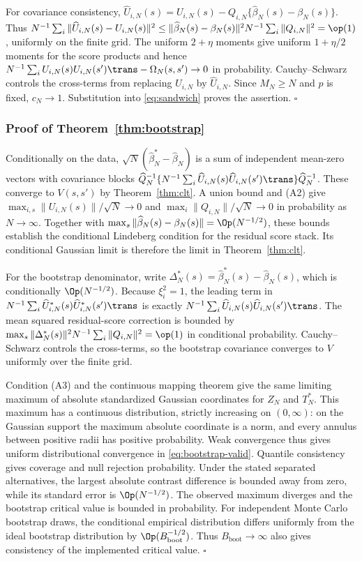 For covariance consistency, $\widehat U_{i,N}(s)=U_{i,N}(s)-Q_{i,N}\{\widehat\beta_N(s)-\beta_N(s)\}$. Thus
$N^{-1}\sum_i\|\widehat U_{i,N}(s)-U_{i,N}(s)\|^2\leq\|\widehat\beta_N(s)-\beta_N(s)\|^2N^{-1}\sum_i\|Q_{i,N}\|^2=\op(1)$, uniformly on the finite grid. The uniform $2+\eta$ moments give uniform $1+\eta/2$ moments for the score products and hence $N^{-1}\sum_iU_{i,N}(s)U_{i,N}(s')\trans-\Omega_N(s,s')\to0$ in probability. Cauchy--Schwarz controls the cross-terms from replacing $U_{i,N}$ by $\widehat U_{i,N}$. Since $M_N\geq N$ and $p$ is fixed, $c_N\to1$. Substitution into \eqref{eq:sandwich} proves the assertion. \hfill$\square$

\subsubsection*{Proof of Theorem~\ref{thm:bootstrap}}
Conditionally on the data, $\sqrt N(\widehat\beta_N^*-\widehat\beta_N)$ is a sum of independent mean-zero vectors with covariance blocks $\widehat Q_N^{-1}\{N^{-1}\sum_i\widehat U_{i,N}(s)\widehat U_{i,N}(s')\trans\}\widehat Q_N^{-1}$. These converge to $V(s,s')$ by Theorem~\ref{thm:clt}. A union bound and (A2) give $\max_{i,s}\|U_{i,N}(s)\|/\sqrt N\to0$ and $\max_i\|Q_{i,N}\|/\sqrt N\to0$ in probability as $N\to\infty$. Together with $\max_s\|\widehat\beta_N(s)-\beta_N(s)\|=\Op(N^{-1/2})$, these bounds establish the conditional Lindeberg condition for the residual score stack. Its conditional Gaussian limit is therefore the limit in Theorem~\ref{thm:clt}.

For the bootstrap denominator, write $\Delta_N^*(s)=\widehat\beta_N^*(s)-\widehat\beta_N(s)$, which is conditionally $\Op(N^{-1/2})$. Because $\xi_i^2=1$, the leading term in $N^{-1}\sum_i\widehat U_{i,N}^*(s)\widehat U_{i,N}^*(s')\trans$ is exactly $N^{-1}\sum_i\widehat U_{i,N}(s)\widehat U_{i,N}(s')\trans$. The mean squared residual-score correction is bounded by $\max_s\|\Delta_N^*(s)\|^2N^{-1}\sum_i\|Q_{i,N}\|^2=\op(1)$ in conditional probability. Cauchy--Schwarz controls the cross-terms, so the bootstrap covariance converges to $V$ uniformly over the finite grid.

Condition (A3) and the continuous mapping theorem give the same limiting maximum of absolute standardized Gaussian coordinates for $Z_N$ and $T_N^*$. This maximum has a continuous distribution, strictly increasing on $(0,\infty)$: on the Gaussian support the maximum absolute coordinate is a norm, and every annulus between positive radii has positive probability. Weak convergence thus gives uniform distributional convergence in \eqref{eq:bootstrap-valid}. Quantile consistency gives coverage and null rejection probability. Under the stated separated alternatives, the largest absolute contrast difference is bounded away from zero, while its standard error is $\Op(N^{-1/2})$. The observed maximum diverges and the bootstrap critical value is bounded in probability. For independent Monte Carlo bootstrap draws, the conditional empirical distribution differs uniformly from the ideal bootstrap distribution by $\Op(B_{\mathrm{boot}}^{-1/2})$. Thus $B_{\mathrm{boot}}\to\infty$ also gives consistency of the implemented critical value. \hfill$\square$

